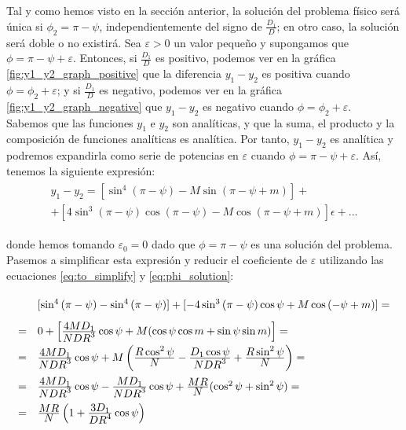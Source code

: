 \documentclass[11pt]{article}
\newcommand\ddfrac[2]{\frac{\displaystyle #1}{\displaystyle #2}}
\begin{document}
\subsection{}
\label{subsec:unicidad}
Tal y como hemos visto en la sección anterior, la solución del problema físico será única si $\phi_2=\pi-\psi$, independientemente del signo de $\frac{D_1}{D}$; en otro caso, la solución será doble o no existirá. Sea $\varepsilon>0$ un valor pequeño y supongamos que $\phi=\pi-\psi+\varepsilon$. Entonces, si $\frac{D_1}{D}$ es positivo, podemos ver en la gráfica \ref{fig:y1_y2_graph_positive} que la diferencia $y_1-y_2$ es positiva cuando $\phi=\phi_2+\varepsilon$; y si $\frac{D_1}{D}$ es negativo, podemos ver en la gráfica \ref{fig:y1_y2_graph_negative} que $y_1-y_2$ es negativo cuando $\phi=\phi_2+\varepsilon$.\\

Sabemos que las funciones $y_1$ e $y_2$ son analíticas, y que la suma, el producto y la composición de funciones analíticas es analítica. Por tanto, $y_1-y_2$ es analítica y podremos expandirla como serie de potencias en $\varepsilon$ cuando $\phi=\pi-\psi+\varepsilon$. Así, tenemos la siguiente expresión:
\begin{align}
\begin{array}{l}
y_1-y_2=[\sin^4{(\pi-\psi)}-M\sin{(\pi-\psi+m)}]+\\+[4\sin^3{(\pi-\psi)}\cos{(\pi-\psi)}-M\cos{(\pi-\psi+m)}]\epsilon+...
\end{array}
\label{eq:y1_y2_serie}
\end{align}

\noindent donde hemos tomando $\varepsilon_0=0$ dado que $\phi=\pi-\psi$ es una solución del problema. Pasemos a simplificar esta expresión y reducir el coeficiente de $\varepsilon$ utilizando las ecuaciones \eqref{eq:to_simplify} y \eqref{eq:phi_solution}:
\[
\def\arraystretch{2}
\begin{array}{ll}
& [\sin^4{(\pi-\psi)}-\sin^4{(\pi-\psi)}]+[-4\sin^3{(\pi-\psi)}\cos{\psi}+M\cos{(-\psi+m)}]=\\
= & 0 + \left[\ddfrac{4MD_1}{NDR^3}\cos{\psi}+M(\cos{\psi}\cos{m}+\sin{\psi}\sin{m})\right]=\\
= & \ddfrac{4MD_1}{NDR^3}\cos{\psi}+M\left(\ddfrac{R\cos^2{\psi}}{N}-\ddfrac{D_1\cos{\psi}}{NDR^3}+\ddfrac{R\sin^2{\psi}}{N}\right)=\\
= & \ddfrac{4MD_1}{NDR^3}\cos{\psi}-\ddfrac{MD_1}{NDR^3}\cos{\psi}+\ddfrac{MR}{N}(\cos^2{\psi}+\sin^2{\psi})=\\
= & \ddfrac{MR}{N}\left(1+\ddfrac{3D_1}{DR^4}\cos{\psi}\right)
\end{array}
\]
\end{document}
